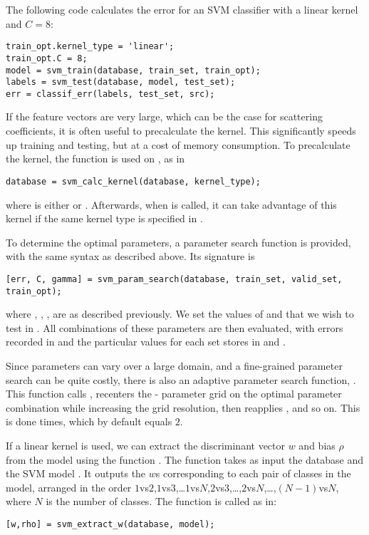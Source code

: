 \documentclass[twocolumn]{article}
\begin{document}
The following code calculates the error for an SVM classifier with a linear kernel and $C = 8$:
\begin{lstlisting}
train_opt.kernel_type = 'linear';
train_opt.C = 8;
model = svm_train(database, train_set, train_opt);
labels = svm_test(database, model, test_set);
err = classif_err(labels, test_set, src);
\end{lstlisting}

If the feature vectors are very large, which can be the case for scattering coefficients, it is often useful to precalculate the kernel. This significantly speeds up training and testing, but at a cost of memory consumption. To precalculate the kernel, the function  is used on , as in
\begin{lstlisting}
database = svm_calc_kernel(database, kernel_type);
\end{lstlisting}
where  is either  or . Afterwards, when  is called, it can take advantage of this kernel if the same kernel type is specified in .

To determine the optimal parameters, a parameter search function  is provided, with the same syntax as described above. Its signature is
\begin{lstlisting}
[err, C, gamma] = svm_param_search(database, train_set, valid_set, train_opt);
\end{lstlisting}
where , , ,  are as described previously. We set the values of  and  that we wish to test in . All combinations of these parameters are then evaluated, with errors recorded in  and the particular values for each set stores in  and .

Since parameters can vary over a large domain, and a fine-grained parameter search can be quite costly, there is also an adaptive parameter search function, . This function calls , recenters the - parameter grid on the optimal parameter combination while increasing the grid resolution,  then reapplies , and so on. This is done  times, which by default equals $2$.

If a linear kernel is used, we can extract the discriminant vector $w$ and bias $\rho$ from the model using the function . The function takes as input the database  and the SVM model . It outputs the $w$s corresponding to each pair of classes in the model, arranged in the order $1$vs$2$,$1$vs$3$,\ldots$1$vs$N$,$2$vs$3$,\ldots,$2$vs$N$,\ldots,$(N-1)$vs$N$, where $N$ is the number of classes. The function is called as in:
\begin{lstlisting}
[w,rho] = svm_extract_w(database, model);
\end{lstlisting}
\end{document}
